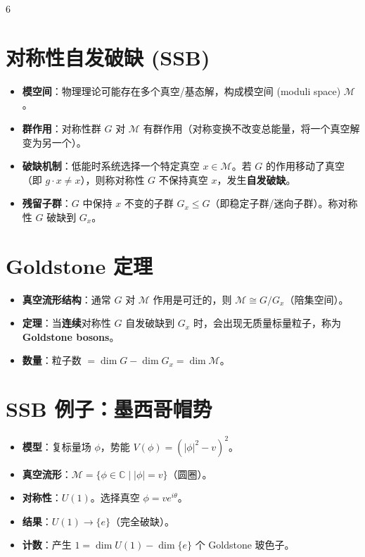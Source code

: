 \documentclass[landscape]{article}
\begin{document}
\begin{multicols*}{6}
\section*{对称性自发破缺 (SSB)}
\begin{itemize}
  \item \textbf{模空间}：物理理论可能存在多个真空/基态解，构成模空间 (moduli space) $\mathcal{M}$。
  \item \textbf{群作用}：对称性群 $G$ 对 $\mathcal{M}$ 有群作用（对称变换不改变总能量，将一个真空解变为另一个）。
  \item \textbf{破缺机制}：低能时系统选择一个特定真空 $x \in \mathcal{M}$。若 $G$ 的作用移动了真空（即 $g \cdot x \neq x$），则称对称性 $G$ 不保持真空 $x$，发生\textbf{自发破缺}。
  \item \textbf{残留子群}：$G$ 中保持 $x$ 不变的子群 $G_x \le G$（即稳定子群/迷向子群）。称对称性 $G$ 破缺到 $G_x$。
\end{itemize}

\section*{Goldstone 定理}
\begin{itemize}
  \item \textbf{真空流形结构}：通常 $G$ 对 $\mathcal{M}$ 作用是可迁的，则 $\mathcal{M} \cong G/G_x$（陪集空间）。
  \item \textbf{定理}：当\textbf{连续}对称性 $G$ 自发破缺到 $G_x$ 时，会出现无质量标量粒子，称为 \textbf{Goldstone bosons}。
  \item \textbf{数量}：粒子数 $= \dim G - \dim G_x = \dim \mathcal{M}$。
\end{itemize}

\section*{SSB 例子：墨西哥帽势}
\begin{itemize}
  \item \textbf{模型}：复标量场 $\phi$，势能 $V(\phi) = (|\phi|^2 - v)^2$。
  \item \textbf{真空流形}：$\mathcal{M} = \{\phi \in \mathbb{C} \mid |\phi| = v\}$（圆圈）。
  \item \textbf{对称性}：$U(1)$。选择真空 $\phi = v e^{i\theta}$。
  \item \textbf{结果}：$U(1) \to \{e\}$（完全破缺）。
  \item \textbf{计数}：产生 $1 = \dim U(1) - \dim \{e\}$ 个 Goldstone 玻色子。
\end{itemize}


\end{multicols*}
\end{document}
